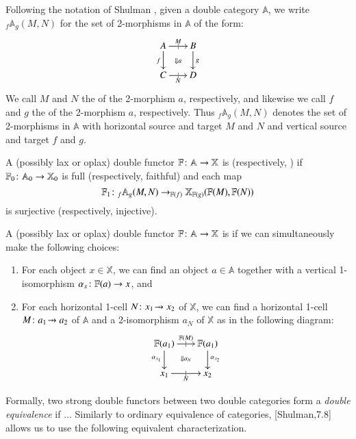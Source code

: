 \documentclass[reqno]{amsart}
\begin{document}
Following the notation of Shulman \cite{Shulman2010}, given a double category $\mathbb{A}$, we write $_f \mathbb{A}_g(M,N)$ for the set of 2-morphisms in $\mathbb{A}$ of the form:
\[
  \xymatrix@-.5pc{
    A \ar[r]|{|}^{M}  \ar[d]_f \ar@{}[dr]|{\Downarrow a}&
    B\ar[d]^g\\
    C \ar[r]|{|}_N & D
  }
\]
We call $M$ and $N$ the  of the 2-morphism $a$, respectively, and likewise we call $f$ and $g$ the  of the 2-morphism $a$, respectively. Thus $_f \mathbb{A}_g(M,N)$ denotes the set of 2-morphisms in $\mathbb{A}$ with horizontal source and target $M$ and $N$ and vertical source and target $f$ and $g$.
\begin{defn}\label{def:fullfaithful}
A (possibly lax or oplax) double functor $\mathbb{F} \colon \mathbb{A} \to \mathbb{X}$ is  (respectively, ) if $\mathbb{F}_0 \colon \mathbb{A}_0 \to \mathbb{X}_0$ is full (respectively, faithful) and each map $$\mathbb{F}_1 \colon _f \mathbb{A}_g(M,N) \to _{\mathbb{F}(f)} \mathbb{X}_{\mathbb{F}(g)}(\mathbb{F}(M),\mathbb{F}(N))$$ is surjective (respectively, injective).
\end{defn}
\begin{defn}\label{def:essentiallysurj}
A (possibly lax or oplax) double functor $\mathbb{F} \colon \mathbb{A} \to \mathbb{X}$ is  if we can simultaneously make the following choices:
\begin{enumerate}
\item{For each object $x \in \mathbb{X}$, we can find an object $a \in \mathbb{A}$ together with a vertical 1-isomorphism $\alpha_x \colon \mathbb{F}(a) \to x$, and}
\item{For each horizontal 1-cell $N \maps x_1 \tobar x_2$  of $\mathbb{X}$, we can find a horizontal 1-cell $M \maps a_1 \tobar a_2$ of $\mathbb{A}$ and a 2-isomorphism $a_{N}$ of $\mathbb{X}$ as in the following diagram:
\[
  \xymatrix@-.5pc{
    \mathbb{F}(a_1) \ar[r]|{|}^{\mathbb{F}(M)}  \ar[d]_{\alpha_{x_1}} \ar@{}[dr]|{\Downarrow a_N}&
    \mathbb{F}(a_1) \ar[d]^{\alpha_{x_2}}\\
    x_1 \ar[r]|{|}_N & x_2
  }
\]
}
\end{enumerate}
\end{defn}

Formally, two strong double functors between two double categories form a \emph{double equivalence} if ...
Similarly to ordinary equivalence of categories, [Shulman,7.8] allows us to use the following equivalent characterization.
\end{document}
